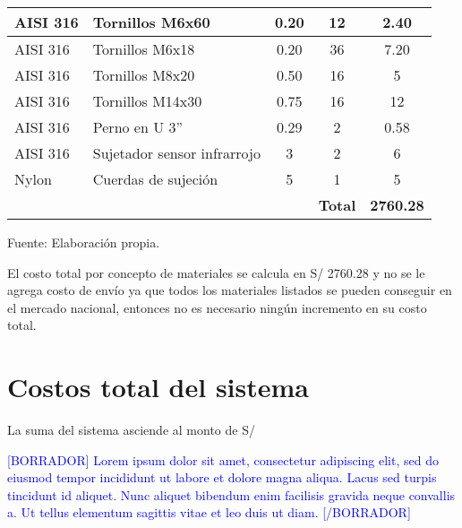 \begin{table}[H]
\begin{tabular}{llc|c|c|}
		\multicolumn{1}{|l|}{AISI 316} & \multicolumn{1}{l|}{Tornillos M6x60} & 0.20 & 12 & 2.40 \\ \hline
		\multicolumn{1}{|l|}{AISI 316} & \multicolumn{1}{l|}{Tornillos M6x18} & 0.20 & 36 & 7.20 \\ \hline
		\multicolumn{1}{|l|}{AISI 316} & \multicolumn{1}{l|}{Tornillos M8x20} & 0.50 & 16 & 5 \\ \hline
		\multicolumn{1}{|l|}{AISI 316} & \multicolumn{1}{l|}{Tornillos M14x30} & 0.75 & 16 & 12 \\ \hline
		\multicolumn{1}{|l|}{AISI 316} & \multicolumn{1}{l|}{Perno en U 3''} & 0.29 & 2 & 0.58 \\ \hline
		\multicolumn{1}{|l|}{AISI 316} & \multicolumn{1}{l|}{Sujetador sensor infrarrojo} & 3 & 2 & 6 \\ \hline
		\multicolumn{1}{|l|}{Nylon} & \multicolumn{1}{l|}{Cuerdas de sujeción} & 5 & 1 & 5 \\ \hline		
		&  &  & \textbf{Total} & \textbf{2760.28} \\ \cline{4-5} 
	\end{tabular}
	\begin{myflushcenteraftertable}	
		Fuente: Elaboración propia.
	\end{myflushcenteraftertable}
\end{table}

El costo total por concepto de materiales se calcula en S/ 2760.28 y no se le agrega costo de envío ya que todos los materiales listados se pueden conseguir en el mercado nacional, entonces no es necesario ningún incremento en su costo total.

\section{Costos total del sistema}

La suma del sistema asciende al monto de S/ 

\textcolor{blue}{[BORRADOR] Lorem ipsum dolor sit amet, consectetur adipiscing elit, sed do eiusmod tempor incididunt ut labore et dolore magna aliqua. Lacus sed turpis tincidunt id aliquet. Nunc aliquet bibendum enim facilisis gravida neque convallis a. Ut tellus elementum sagittis vitae et leo duis ut diam. [/BORRADOR]} 

